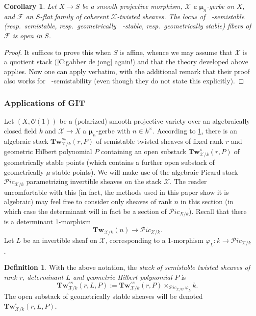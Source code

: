 \documentclass[11pt]{amsart}
\newcommand{\ms}[1]{\mathscr #1}
\renewcommand{\phi}{\varphi}
\DeclareMathOperator{\muhat}{\widehat{\mu}}
\newcommand{\m}{\boldsymbol{\mu}}
\renewcommand{\[}{[\!\hspace{0.03em}[}
\renewcommand{\]}{]\!\hspace{0.03em}]}
\renewcommand{\(}{(\!\hspace{0.03em}(}
\renewcommand{\)}{)\!\hspace{0.03em})}
\newcommand{\Tw}{\mathbf{Tw}}
\newtheorem{cor}[lem]{Corollary}
\theoremstyle{definition}
\newtheorem{defn}[lem]{Definition}
\theoremstyle{remark}
\begin{document}
\begin{cor}\label{C:openness of stuff} Let $X\to S$ be a smooth projective morphism, $\ms X$ a 
$\m_{n}$-gerbe on $X$, and $\ms F$ 
an $S$-flat family of coherent $\ms X$-twisted sheaves.  The locus 
of $\muhat$-semistable (resp.\ semistable, resp.\ geometrically 
$\muhat$-stable, resp.\ geometrically stable) fibers of $\ms F$ is 
open in $S$.
\end{cor}
\begin{proof} It suffices to prove this when $S$ is affine, whence we 
may assume that $\ms X$ is a quotient stack (\ref{C:gabber de jong} 
again!) and that the theory 
developed above applies.  Now one can apply \cite[2.3.1]{h-l} 
verbatim, with the additional remark that their proof also works 
for $\muhat$-semistability (even though they do not state this 
explicitly).\end{proof}

\subsubsection{Applications of GIT}
Let $(X,{\ms O}(1))$ be a (polarized) smooth projective variety over an algebraically closed 
field $k$ and $\ms X\to X$ a $\m_{n}$-gerbe with $n\in k^{\times}$.  
According to \ref{C:openness of stuff}, there is an algebraic stack 
$\Tw^{ss}_{\ms X/k}(r,P)$ of 
semistable twisted sheaves of fixed rank $r$ and geometric Hilbert 
polynomial $P$ containing an open substack $\Tw^{s}_{\ms X/k}(r,P)$ 
of geometrically stable points (which contains a further open substack of 
geometrically $\mu$-stable points).  We will make use of the algebraic Picard stack $\ms Pic_{\ms X/k}$ parametrizing invertible sheaves on the stack $\ms X$.  The reader uncomfortable with this (in fact, the methods used in this paper show it is algebraic) may feel free to consider only sheaves of rank $n$ in 
this section (in which case the determinant will in fact be a section of $\ms Pic_{X/k}$).  Recall that there is a determinant 1-morphism
$$\Tw_{\ms X/k}(n)\to\ms Pic_{\ms X/k}.$$
Let $L$ be an invertible sheaf on $\ms X$, corresponding to a 1-morphism 
$\phi_{L}:k\to\ms Pic_{\ms X/k}$.

\begin{defn} With the above notation, the \emph{stack of semistable twisted sheaves of rank 
$r$, determinant $L$ and geometric Hilbert polynomial $P$\/} is 
$$\Tw^{ss}_{\ms X/k}(r,L,P):=\Tw^{ss}_{\ms X/k}(r,P)\times_{\ms 
Pic_{\ms X/k},\phi_{L}}k.$$
The open substack of geometrically stable sheaves will be denoted $\Tw^{s}_{\ms 
X/k}(r,L,P)$.
\end{defn}
\end{document}
